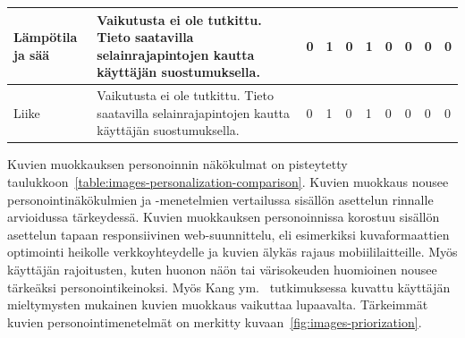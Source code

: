 \documentclass[finnish, 12pt, a4paper, elec, utf8, a-1b, online]{aaltothesis}
\begin{document}
{\begin{longtable}{p{2.5cm}|p{6cm}|p{0.5cm}p{0.5cm}p{0.5cm}|p{0.5cm}|p{0.5cm}p{0.5cm}p{0.5cm}|p{0.5cm}|}
    \midrule
    Lämpötila ja sää                       & Vaikutusta ei ole tutkittu. Tieto saatavilla selainrajapintojen kautta käyttäjän suostumuksella.                                                                                                                                                                                                                                                                      & 0                                          & 1                                   & 0                                      & 1                            & 0                                               & 0                                         & 0                                         & 0                            \\
    \midrule
    Liike                                  & Vaikutusta ei ole tutkittu. Tieto saatavilla selainrajapintojen kautta käyttäjän suostumuksella.                                                                                                                                                                                                                                                                      & 0                                          & 1                                   & 0                                      & 1                            & 0                                               & 0                                         & 0                                         & 0                            \\
\end{longtable}
}

Kuvien muokkauksen personoinnin näkökulmat on pisteytetty
taulukkoon~\ref{table:images-personalization-comparison}. Kuvien muokkaus nousee
personointinäkökulmien ja -menetelmien vertailussa sisällön asettelun rinnalle
arvioidussa tärkeydessä. Kuvien muokkauksen personoinnissa korostuu sisällön
asettelun tapaan responsiivinen web-suunnittelu, eli esimerkiksi kuvaformaattien
optimointi heikolle verkkoyhteydelle ja kuvien älykäs rajaus mobiililaitteille.
Myös käyttäjän rajoitusten, kuten huonon näön tai värisokeuden huomioinen nousee
tärkeäksi personointikeinoksi. Myös Kang ym.~\cite{5539850} tutkimuksessa
kuvattu käyttäjän mieltymysten mukainen kuvien muokkaus vaikuttaa lupaavalta.
Tärkeimmät kuvien personointimenetelmät on merkitty
kuvaan~\ref{fig:images-priorization}.
\end{document}
